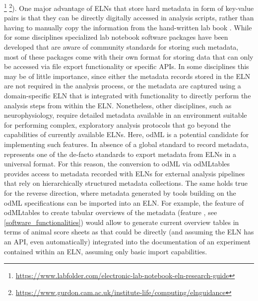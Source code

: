 \footnote{\url{https://www.labfolder.com/electronic-lab-notebook-eln-research-guide}} \footnote{\url{https://www.gurdon.cam.ac.uk/institute-life/computing/elnguidance}}). One major advantage of ELNs that store hard metadata \citep{Grewe_2011} in form of key-value pairs is that they can be directly digitally accessed in analysis scripts, rather than having to manually copy the information from the hand-written lab book \citep{Zehl_2016}. While for some disciplines specialized lab notebook software packages have been developed \citep{Kwok18_269} that are aware of community standards for storing such metadata, most of these packages come with their own format for storing data that can only be accessed via file export functionality or specific APIs. In some disciplines this may be of little importance, since either the metadata records stored in the ELN are not required in the analysis process, or the metadata are captured using a domain-specific ELN that is integrated with functionality to directly perform the analysis steps from within the ELN. Nonetheless, other disciplines, such as neurophysiology, require detailed metadata available in an environment suitable for performing complex, exploratory analysis protocols that go beyond the capabilities of currently available ELNs. Here, odML is a potential candidate for implementing such features. In absence of a global standard to record metadata,  represents one of the de-facto standards to export metadata from ELNs in a universal format. For this reason, the conversion to odML via odMLtables provides access to metadata recorded with ELNs for external analysis pipelines that rely on hierarchically structured metadata collections. The same holds true for the reverse direction, where metadata generated by tools building on the odML specifications can be imported into an ELN. For example, the feature of odMLtables to create tabular overviews of the metadata (feature \fcompare, see \cref{software_functionalities}) would allow to generate current overview tables in terms of animal score sheets as  that could be directly (and assuming the ELN has an API, even automatically) integrated into the documentation of an experiment contained within an ELN, assuming only basic  import capabilities. 

